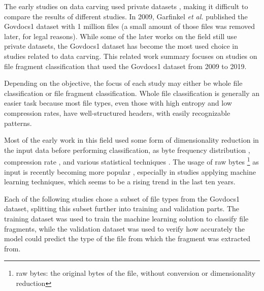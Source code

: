 The early studies on data carving used private datasets
\cite{karresand_file_2006} \cite{veenman_statistical_2007} \cite{erbacher_identification_2007} \cite{moody_sadi-statistical_2008} \cite{calhoun_predicting_2008} \cite{li_novel_2010} \cite{conti_automated_2010} \cite{kattan_gp-fileprints:_2010},
making it difficult to compare the results of different studies. In 2009, Garfinkel \textit{et al.} \cite{garfinkel_bringing_2009} published the Govdocs1 dataset with 1 million files (a small amount of those files was removed later, for legal reasons). While some of the later works on the field still use private datasets, the Govdocs1 dataset has become the most used choice in studies related to data carving. This related work summary focuses on studies on file fragment classification that used the Govdocs1 dataset from 2009 to 2019.

Depending on the objective, the focus of each study may either be whole file classification or file fragment classification. Whole file classification is generally an easier task because most file types, even those with high entropy and low compression rates, have well-structured headers, with easily recognizable patterns.

Most of the early work in this field used some form of dimensionality reduction in the input data before performing classification, as byte frequency distribution 
\cite{karresand_oscarfile_2006} \cite{harris_using_2007} \cite{amirani_new_2008} \cite{ahmed_content-based_2010} \cite{ahmed_fast_2010} \cite{sportiello_context-based_2012} \cite{amirani_feature-based_2013} \cite{qiu_new_2014} \cite{maslim_distributed_2014} \cite{ali_classification_2018}, compression rate \cite{axelsson_normalised_2010} \cite{penrose_approaches_2013}, and various statistical techniques \cite{veenman_statistical_2007} \cite{erbacher_identification_2007} \cite{moody_sadi-statistical_2008} \cite{calhoun_predicting_2008} \cite{li_novel_2010} \cite{kattan_gp-fileprints:_2010} \cite{gopal_statistical_2011}. The usage of raw bytes \footnote{raw bytes: the original bytes of the file, without conversion or dimensionality reduction} as input is recently becoming more popular \cite{hiester_file_2018} \cite{chen_file_2018} \cite{wang_sparse_2018} \cite{wang_file_2018} \cite{vulinovic_neural_2019},
especially in studies applying machine learning techniques, which seems to be a rising trend in the last ten years.

Each of the following studies chose a subset of file types from the Govdocs1 dataset, splitting this subset further into training and validation parts. The training dataset was used to train the machine learning solution to classify file fragments, while the validation dataset was used to verify how accurately the model could predict the type of the file from which the fragment was extracted from.

